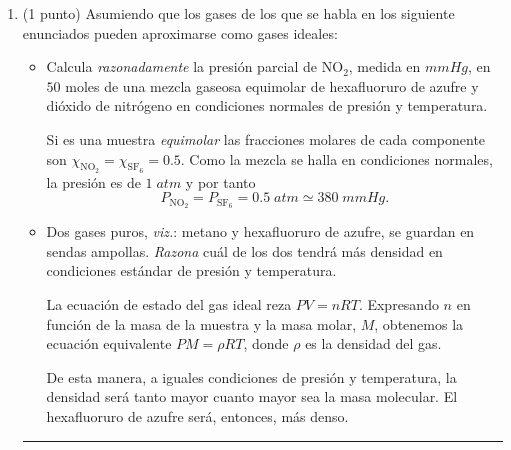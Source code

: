 \documentclass[a4paper,14pt]{extarticle}
\title{\textbf{	}}
\date{}
\newcommand*\chem[1]{\ensuremath{\mathrm{#1}}}
\newcommand{\halmos}{
\vspace*{-1ex}

\begin{flushright}
\rule{1mm}{2.5mm} \end{flushright}
\vspace*{-1.5ex}

}
\renewcommand{\qed}{\halmos}
\begin{document}



\begin{enumerate}
  \setlength\itemsep{1.5em}
    
    
    \item (1 punto) Asumiendo que los gases de los que se habla en los siguiente enunciados pueden aproximarse como gases ideales:
    	\begin{itemize}
    		\item[a)] Calcula \textit{razonadamente} la presión parcial de $\chem{NO_2}$, medida en $mmHg$, en $50$ moles de una mezcla gaseosa equimolar de hexafluoruro de azufre y dióxido de nitrógeno en condiciones normales de presión y temperatura. 
    		\begin{mdframed}[backgroundcolor=brown!10]  
    		Si es una muestra \textit{equimolar} las fracciones molares de cada componente son $\chi_\chem{NO_2}=\chi_\chem{SF_6}=0.5$. Como la mezcla se halla en condiciones normales, la presión es de $1\;atm$ y por tanto $$P_\chem{NO_2}=P_\chem{SF_6}=0.5\;atm\simeq 380\;mmHg.$$
    		\end{mdframed}
    		\item[b)] Dos gases puros, \textit{viz.}: metano y hexafluoruro de azufre, se guardan en sendas ampollas. \textit{Razona} cuál de los dos tendrá más densidad en condiciones estándar de presión y temperatura.
    		\begin{mdframed}[backgroundcolor=brown!10]  
    		La ecuación de estado del gas ideal reza $PV=nRT$. Expresando $n$ en función de la masa de la muestra y la masa molar, $M$, obtenemos la ecuación equivalente $PM=\rho RT$, donde $\rho$ es la densidad del gas. 
    		
    		De esta manera, a iguales condiciones de presión y temperatura, la densidad será tanto mayor cuanto mayor sea la masa molecular. El hexafluoruro de azufre será, entonces, más denso.
    		
    		
    		\end{mdframed}
    	\end{itemize}
    \qed
    
    \newpage
    

\end{enumerate}
\end{document}
